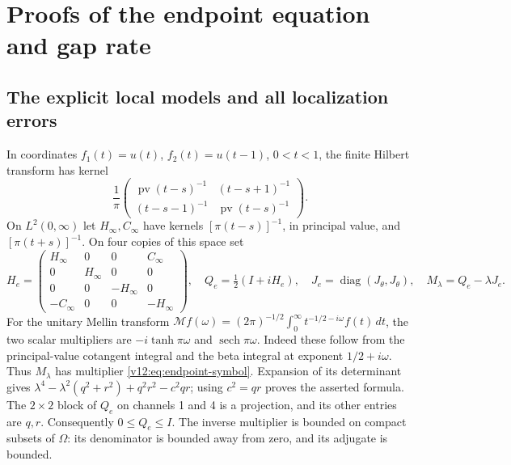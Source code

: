 \section{Proofs of the endpoint equation and gap rate}
\label{v12:app:mellin-proofs}

\subsection{The explicit local models and all localization errors}

In coordinates $f_1(t)=u(t)$, $f_2(t)=u(t-1)$, $0<t<1$, the finite
Hilbert transform has kernel
\[
 \frac1\pi\begin{pmatrix}
 \operatorname{pv}(t-s)^{-1}&(t-s+1)^{-1}\\
 (t-s-1)^{-1}&\operatorname{pv}(t-s)^{-1}
 \end{pmatrix}.
\]
On $L^2(0,\infty)$ let $H_\infty,C_\infty$ have kernels
$[\pi(t-s)]^{-1}$, in principal value, and $[\pi(t+s)]^{-1}$.
On four copies of this space set
\[
 H_e=\begin{pmatrix}
 H_\infty&0&0&C_\infty\\0&H_\infty&0&0\\
 0&0&-H_\infty&0\\-C_\infty&0&0&-H_\infty
 \end{pmatrix},\quad Q_e=\tfrac12(I+iH_e),\quad
 J_e=\operatorname{diag}(J_\theta,J_\theta),\quad
 M_\lambda=Q_e-\lambda J_e.
\]
For the unitary Mellin transform
$\mathcal Mf(\omega)=(2\pi)^{-1/2}\int_0^\infty
t^{-1/2-i\omega}f(t)\,dt$, the two scalar multipliers are
$-i\tanh\pi\omega$ and $\operatorname{sech}\pi\omega$.
Indeed these follow from the principal-value cotangent integral and
the beta integral at exponent $1/2+i\omega$.  Thus $M_\lambda$ has
multiplier \eqref{v12:eq:endpoint-symbol}.  Expansion of its determinant
gives $\lambda^4-\lambda^2(q^2+r^2)+q^2r^2-c^2qr$; using $c^2=qr$
proves the asserted formula.  The $2\times2$ block of $Q_e$ on
channels 1 and 4 is a projection, and its other entries are $q,r$.
Consequently $0\le Q_e\le I$.  The inverse multiplier is bounded on
compact subsets of $\Omega$: its denominator is bounded away from zero,
and its adjugate is bounded.

